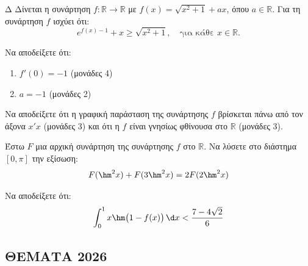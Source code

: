 \begin{thema}{Δ}
Δίνεται η συνάρτηση $f: \mathbb{R} \to \mathbb{R}$ με $f(x) = \sqrt{x^2 + 1} + a x$, όπου $a \in \mathbb{R}$. Για τη συνάρτηση $f$ ισχύει ότι:
\[
e^{f(x)-1} + x \geq \sqrt{x^2+1}, \quad \text{για κάθε } x \in \mathbb{R}.
\]
\begin{erwthma}
    \item Να αποδείξετε ότι:
    \begin{enumerate}[label=\roman*)]
        \item $f'(0) = -1$ \hfill (μονάδες 4)
        \item $a = -1$ \hfill (μονάδες 2)
    \end{enumerate}

    \item Να αποδείξετε ότι η γραφική παράσταση της συνάρτησης $f$ βρίσκεται πάνω από τον άξονα $x'x$ (μονάδες 3) και ότι η $f$ είναι γνησίως φθίνουσα στο $\mathbb{R}$ (μονάδες 3). 

    \item Έστω $F$ μια αρχική συνάρτηση της συνάρτησης $f$ στο $\mathbb{R}$. Να λύσετε στο διάστημα $[0, \pi]$ την εξίσωση:
    \[
    F(\hm^2 x) + F(3\hm^2 x) = 2F(2\hm^2 x)
    \]

    \item Να αποδείξετε ότι:
    \[
    \int_0^1 x\hm\bigl(1 - f(x)\bigr)\,\d x < \frac{7 - 4\sqrt{2}}{6}
    \]
\end{erwthma}
\end{thema}



\subsection{ΘΕΜΑΤΑ 2026}
